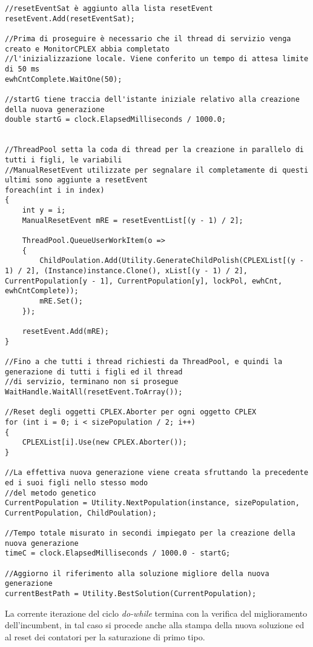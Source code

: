 \documentclass[11pt]{article}
\begin{document}
\begin{lstlisting}
//resetEventSat è aggiunto alla lista resetEvent
resetEvent.Add(resetEventSat);

//Prima di proseguire è necessario che il thread di servizio venga creato e MonitorCPLEX abbia completato 
//l'inizializzazione locale. Viene conferito un tempo di attesa limite di 50 ms
ewhCntComplete.WaitOne(50);

//startG tiene traccia dell'istante iniziale relativo alla creazione della nuova generazione
double startG = clock.ElapsedMilliseconds / 1000.0;


//ThreadPool setta la coda di thread per la creazione in parallelo di tutti i figli, le variabili
//ManualResetEvent utilizzate per segnalare il completamente di questi ultimi sono aggiunte a resetEvent
foreach(int i in index)
{
    int y = i;
    ManualResetEvent mRE = resetEventList[(y - 1) / 2];

    ThreadPool.QueueUserWorkItem(o =>
    {
        ChildPoulation.Add(Utility.GenerateChildPolish(CPLEXList[(y - 1) / 2], (Instance)instance.Clone(), xList[(y - 1) / 2], CurrentPopulation[y - 1], CurrentPopulation[y], lockPol, ewhCnt, ewhCntComplete));
        mRE.Set();
    });

    resetEvent.Add(mRE);
}

//Fino a che tutti i thread richiesti da ThreadPool, e quindi la generazione di tutti i figli ed il thread
//di servizio, terminano non si prosegue
WaitHandle.WaitAll(resetEvent.ToArray());

//Reset degli oggetti CPLEX.Aborter per ogni oggetto CPLEX
for (int i = 0; i < sizePopulation / 2; i++)
{
    CPLEXList[i].Use(new CPLEX.Aborter());
}

//La effettiva nuova generazione viene creata sfruttando la precedente ed i suoi figli nello stesso modo
//del metodo genetico
CurrentPopulation = Utility.NextPopulation(instance, sizePopulation, CurrentPopulation, ChildPoulation);

//Tempo totale misurato in secondi impiegato per la creazione della nuova generazione
timeC = clock.ElapsedMilliseconds / 1000.0 - startG;

//Aggiorno il riferimento alla soluzione migliore della nuova generazione
currentBestPath = Utility.BestSolution(CurrentPopulation);
\end{lstlisting}

La corrente iterazione del ciclo \textit{do-while} termina con la verifica del miglioramento dell'incumbent, in tal caso si procede anche alla stampa della nuova soluzione ed al reset dei contatori per la saturazione di primo tipo.
\end{document}
